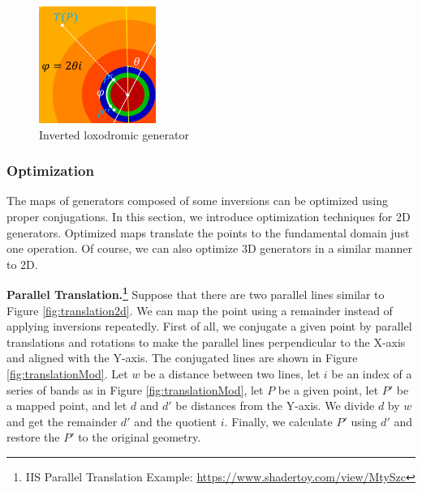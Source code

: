 \begin{figure}[h!tbp]
\begin{minipage}[t]{0.24\hsize}
 \end{minipage}
  \hspace*{\fill}
 \begin{minipage}[t]{0.24\hsize}
   \begin{center}
    \includegraphics[width=1.5in, height=1.5in, keepaspectratio]{./img/application/optimization/loxodromicModRotation.pdf}
   \end{center}
   \caption{Inverted loxodromic generator}
   \label{fig:loxodromicRotationMod}
  \hspace*{\fill}
 \end{minipage}
\end{figure}


\subsubsection{Optimization}

 The maps of generators composed of some inversions
 can be optimized using proper conjugations.
 In this section, we introduce optimization techniques for 2D
 generators.
 Optimized maps translate the points to the fundamental domain just one operation.
 Of course, we can also optimize 3D generators in a similar manner to 2D.

 \noindent\textbf{Parallel Translation.\footnote{IIS Parallel Translation Example: \url{https://www.shadertoy.com/view/MtySzc}}}
 Suppose that there are two parallel lines similar to Figure
 \ref{fig:translation2d}.
 We can map the point using a remainder instead of applying inversions
 repeatedly.
 First of all, we conjugate a given point by parallel translations and rotations to make the
 parallel lines perpendicular to the X-axis and aligned with the Y-axis.
 The conjugated lines are shown in Figure \ref{fig:translationMod}.
 Let $w$ be a distance between two lines, let $i$ be an index of a series
 of bands as in Figure \ref{fig:translationMod}, let $P$ be a given point, let
 $P'$ be a mapped point, and let $d$ and $d'$ be distances from the Y-axis.
 We divide $d$ by $w$ and get the remainder $d'$ and the
 quotient $i$.
 Finally, we calculate $P'$ using $d'$ and restore the $P'$ to the
 original geometry.

